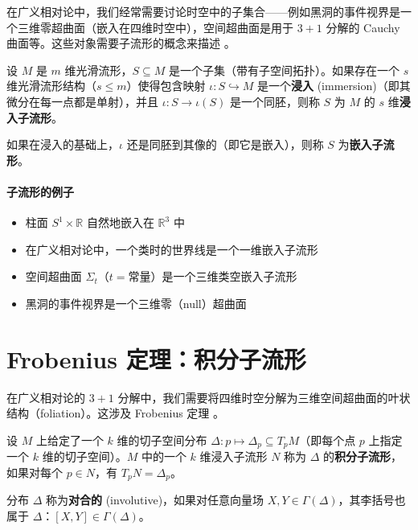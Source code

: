 在广义相对论中，我们经常需要讨论时空中的子集合——例如黑洞的事件视界是一个三维零超曲面（嵌入在四维时空中），空间超曲面是用于 $3+1$ 分解的 Cauchy 曲面等。这些对象需要子流形的概念来描述 \cite{Gourgoulhon2007}。

\begin{definition}[浸入子流形]
设 $M$ 是 $m$ 维光滑流形，$S \subseteq M$ 是一个子集（带有子空间拓扑）。如果存在一个 $s$ 维光滑流形结构（$s \leq m$）使得包含映射 $\iota: S \hookrightarrow M$ 是一个\textbf{浸入} (immersion)（即其微分在每一点都是单射），并且 $\iota: S \to \iota(S)$ 是一个同胚，则称 $S$ 为 $M$ 的 $s$ 维\textbf{浸入子流形}。

如果在浸入的基础上，$\iota$ 还是同胚到其像的（即它是嵌入），则称 $S$ 为\textbf{嵌入子流形}。
\end{definition}

\paragraph{子流形的例子}

\begin{itemize}
    \item 柱面 $S^1 \times \mathbb{R}$ 自然地嵌入在 $\mathbb{R}^3$ 中
    \item 在广义相对论中，一个类时的世界线是一个一维嵌入子流形
    \item 空间超曲面 $\Sigma_t$（$t = \text{常量}$）是一个三维类空嵌入子流形
    \item 黑洞的事件视界是一个三维零（null）超曲面
\end{itemize}

\section{Frobenius 定理：积分子流形}

在广义相对论的 $3+1$ 分解中，我们需要将四维时空分解为三维空间超曲面的叶状结构（foliation）。这涉及 Frobenius 定理 \cite{Gourgoulhon2007}。

\begin{definition}[积分子流形与对合分布]
设 $M$ 上给定了一个 $k$ 维的切子空间分布 $\Delta: p \mapsto \Delta_p \subseteq T_pM$（即每个点 $p$ 上指定一个 $k$ 维的切子空间）。$M$ 中的一个 $k$ 维浸入子流形 $N$ 称为 $\Delta$ 的\textbf{积分子流形}，如果对每个 $p \in N$，有 $T_pN = \Delta_p$。

分布 $\Delta$ 称为\textbf{对合的} (involutive)，如果对任意向量场 $X, Y \in \Gamma(\Delta)$，其李括号也属于 $\Delta$：$[X, Y] \in \Gamma(\Delta)$。
\end{definition}

